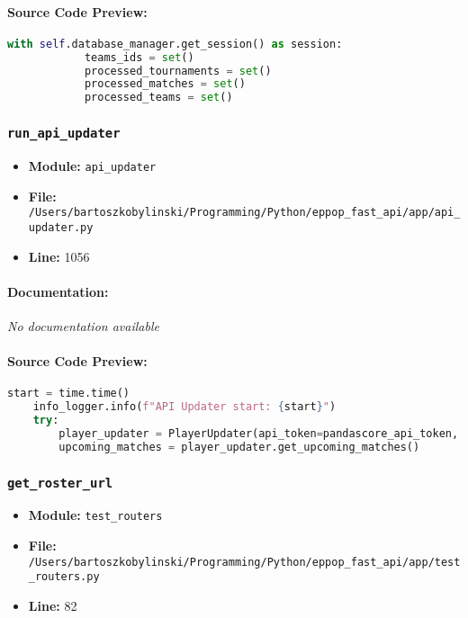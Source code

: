 \documentclass[11pt,a4paper]{article}
\begin{document}
\paragraph{Source Code Preview:}
\begin{lstlisting}[language=Python]
        with self.database_manager.get_session() as session:
            teams_ids = set()
            processed_tournaments = set()
            processed_matches = set()
            processed_teams = set()
\end{lstlisting}

\vspace{1em}
\subsubsection{\texttt{run\_api\_updater}}

\begin{itemize}
    \item \textbf{Module:} \texttt{api\_updater}
    \item \textbf{File:} \texttt{/Users/bartoszkobylinski/Programming/Python/eppop\_fast\_api/app/api\_updater.py}
    \item \textbf{Line:} 1056
\end{itemize}

\paragraph{Documentation:} \textit{No documentation available}

\paragraph{Source Code Preview:}
\begin{lstlisting}[language=Python]
    start = time.time()
    info_logger.info(f"API Updater start: {start}")
    try:
        player_updater = PlayerUpdater(api_token=pandascore_api_token, user=db_user, password=db_password, host=db_host, port=db_port, db_name=db_name)
        upcoming_matches = player_updater.get_upcoming_matches()
\end{lstlisting}

\vspace{1em}
\subsubsection{\texttt{get\_roster\_url}}

\begin{itemize}
    \item \textbf{Module:} \texttt{test\_routers}
    \item \textbf{File:} \texttt{/Users/bartoszkobylinski/Programming/Python/eppop\_fast\_api/app/test\_routers.py}
    \item \textbf{Line:} 82
\end{itemize}
\end{document}
